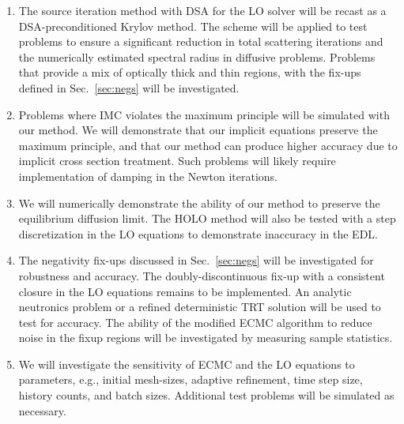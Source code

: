 \documentclass[11pt]{article}
\begin{document}
\begin{enumerate}
    \item The source iteration method with DSA for the LO solver will be recast as a
        DSA-preconditioned Krylov method.  The scheme will be applied to test problems to ensure a significant reduction in total scattering
        iterations and the numerically estimated spectral radius in diffusive problems.  Problems that provide a mix of optically
        thick and thin regions, with the fix-ups defined in Sec.~\ref{sec:negs} will be investigated.
    \item Problems where IMC violates the maximum principle will be simulated with our
        method.  We will demonstrate that our implicit equations preserve the maximum
        principle, and that our method can produce higher accuracy due to implicit cross section
        treatment. Such problems will likely require implementation of damping in the
        Newton iterations.
    \item We will numerically demonstrate the ability of our method to preserve
        the equilibrium diffusion limit.  The HOLO method will also be tested with a step
        discretization in the LO equations to demonstrate inaccuracy in the EDL.
    \item The negativity fix-ups discussed in Sec.~\ref{sec:negs} will be investigated for robustness and
        accuracy.  The doubly-discontinuous fix-up with a consistent closure in the
        LO equations remains to be implemented.  An analytic neutronics problem or a refined deterministic TRT solution
        will be used to test for accuracy.  The ability of the modified ECMC
        algorithm to reduce noise in
        the fixup regions will be investigated by measuring sample statistics.
    \item We will investigate the sensitivity of ECMC and the LO equations to
        parameters, e.g., initial mesh-sizes, adaptive refinement, time step size, history
        counts, and batch sizes.  Additional test problems will be simulated as
        necessary.
\end{enumerate}
\pagebreak


\begin{spacing}{1}
  
  
\end{spacing}
\end{document}
